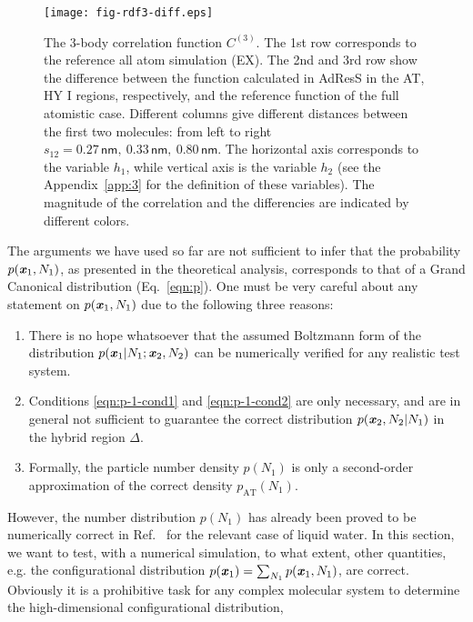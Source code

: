 \documentclass[aip,jcp,a4paper,reprint,onecolumn]{revtex4-1}
\newcommand{\redc}[1]{{\color{red} #1}}
\newcommand{\bluec}[1]{{\color{blue} #1}}
\newcommand{\vect}[1]{\textbf{\textit{#1}}}
\newcommand{\AT}{{\textrm{{AT}}}}
\newcommand{\HY}{{\Delta}}
\newcommand{\corr}{C^{(3)}}
\begin{document}
\begin{figure}
  \centering
  \texttt{[image: fig-rdf3-diff.eps]}
  \caption{\redc{The 3-body correlation function $\corr$.  The 1st row corresponds to the reference all atom simulation (EX).
    The 2nd and 3rd row show the difference between the function calculated in AdResS in the AT, HY I
    regions, respectively, and the reference function of the full atomistic case.}
    Different columns give different distances between
    the first two molecules: from left to right $s_{12} =
    0.27\,\textsf{nm},\ 0.33\,\textsf{nm},\  
    0.80\,\textsf{nm}$.  The \bluec{horizontal} axis corresponds to the variable $h_1$, while \bluec{vertical}
    axis is the variable $h_2$ (see the Appendix~\ref{app:3} for the
    definition of these variables).  \bluec{The magnitude of the correlation
    and the differencies are indicated by
    different colors.}
  }
  \label{fig:tmp2b}
\end{figure}
The arguments we have used so far are not sufficient to infer that the probability $p(\vect x_1 , N_1)$,
as presented in the theoretical analysis, corresponds to that of a Grand Canonical distribution  (Eq.~\eqref{eqn:p}).
One must be very careful about any statement on $p(\vect x_1, N_1)$ 
due to the following three reasons:
\begin{enumerate}
\item There is no hope whatsoever that the assumed Boltzmann form of the distribution $p(\vect x_1|N_1; \vect x_2, N_2)$ can be numerically verified  for any realistic test system. 
\item Conditions \eqref{eqn:p-1-cond1} and \eqref{eqn:p-1-cond2}
are only necessary, and are in general not sufficient to guarantee
the correct distribution $p(\vect x_2, N_2 | N_1)$ in the hybrid region $\HY$.
\item Formally, the particle number density $p(N_1)$ is only a second-order approximation of the correct density $p_{\AT}(N_{1})$.
\end{enumerate}
However, the number distribution $p(N_1)$ has already
been proved to be numerically correct in Ref.~ for the relevant case of liquid water. In this section, we want to test, with a numerical simulation, to what extent, other quantities, e.g. the configurational distribution $p(\vect x_1) = \sum_{N_1}p(\vect x_1, N_1)$, are correct. 
Obviously it is a prohibitive task for any complex molecular system to determine the high-dimensional configurational distribution,
\end{document}
